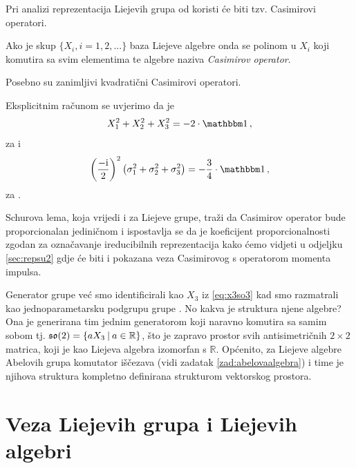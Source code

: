 Pri analizi reprezentacija Liejevih grupa od koristi će biti
tzv. Casimirovi operatori.
\begin{definicija}
Ako je skup $\{X_i, i=1,2, ... \}$ baza Liejeve algebre onda se polinom
u $X_i$ koji komutira sa svim elementima te algebre naziva 
\emph{Casimirov operator}.
\end{definicija}
Posebno su zanimljivi kvadratični Casimirovi operatori.
\begin{primjer}
 Eksplicitnim računom se uvjerimo da je 
\begin{equation}
X_{1}^2 + X_{2}^2 + X_{3}^2 = -2\cdot \Eins \,,
\end{equation}
    za  i
\begin{equation}
    \left(\frac{-\rmi}{2}\right)^2
    \big(\sigma_{1}^2 + \sigma_{2}^2 + \sigma_{3}^2\big) = -\frac{3}{4} \cdot \Eins \,,
\end{equation}
    za .
\end{primjer}
Schurova lema, koja vrijedi i za Liejeve grupe, traži da Casimirov operator 
bude proporcionalan jediničnom i ispostavlja se da je koeficijent proporcionalnosti
zgodan za označavanje ireducibilnih reprezentacija kako ćemo vidjeti u 
odjeljku \ref{sec:repsu2} gdje će biti i pokazana veza Casimirovog s operatorom
momenta impulsa.


\begin{primjer} 
    Generator grupe  već smo identificirali kao $X_3$ iz
    \ref{eq:x3so3} kad smo 
    razmatrali kao jednoparametarsku podgrupu grupe .
    No kakva je struktura njene algebre? Ona je generirana tim
    jednim generatorom koji naravno komutira sa samim sobom
    tj. $\mathfrak{so}(2) = \{ aX_{3} \: | \: a \in \mathbb{R} \}$, što je
    zapravo prostor svih antisimetričnih $2\times 2$ matrica,
    koji je kao Liejeva algebra izomorfan s $\mathbb{R}$.
    Općenito, za Liejeve algebre Abelovih grupa komutator iščezava 
    (vidi zadatak \ref{zad:abelovaalgebra}) i time
    je njihova struktura kompletno definirana strukturom vektorskog
    prostora. \label{pr:so2Alg}
\end{primjer}


\section{Veza Liejevih grupa i Liejevih algebri}

